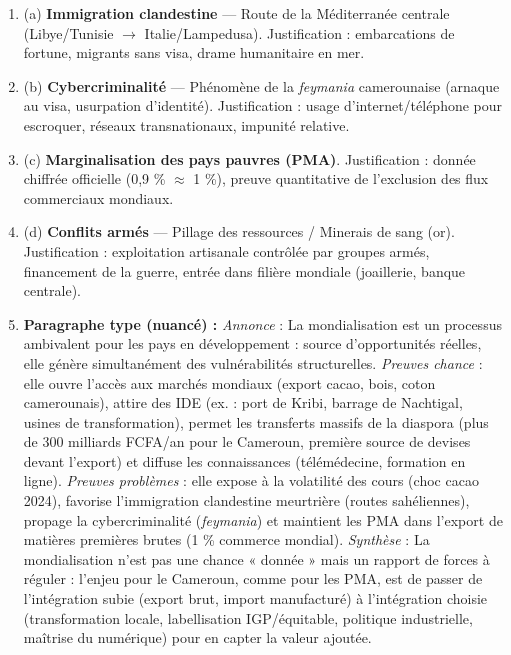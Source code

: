 \documentclass[11pt]{article}
\begin{document}
\begin{corrige}
\begin{enumerate}
\item (a) \textbf{Immigration clandestine} — Route de la Méditerranée centrale (Libye/Tunisie $\to$ Italie/Lampedusa). Justification : embarcations de fortune, migrants sans visa, drame humanitaire en mer.
\item (b) \textbf{Cybercriminalité} — Phénomène de la \emph{feymania} camerounaise (arnaque au visa, usurpation d'identité). Justification : usage d'internet/téléphone pour escroquer, réseaux transnationaux, impunité relative.
\item (c) \textbf{Marginalisation des pays pauvres (PMA)}. Justification : donnée chiffrée officielle (0,9 \% $\approx$ 1 \%), preuve quantitative de l'exclusion des flux commerciaux mondiaux.
\item (d) \textbf{Conflits armés} — Pillage des ressources / Minerais de sang (or). Justification : exploitation artisanale contrôlée par groupes armés, financement de la guerre, entrée dans filière mondiale (joaillerie, banque centrale).
\item \textbf{Paragraphe type (nuancé) :} \emph{Annonce} : La mondialisation est un processus ambivalent pour les pays en développement : source d'opportunités réelles, elle génère simultanément des vulnérabilités structurelles. \emph{Preuves chance} : elle ouvre l'accès aux marchés mondiaux (export cacao, bois, coton camerounais), attire des IDE (ex. : port de Kribi, barrage de Nachtigal, usines de transformation), permet les transferts massifs de la diaspora (plus de \num{300} milliards FCFA/an pour le Cameroun, première source de devises devant l'export) et diffuse les connaissances (télémédecine, formation en ligne). \emph{Preuves problèmes} : elle expose à la volatilité des cours (choc cacao 2024), favorise l'immigration clandestine meurtrière (routes sahéliennes), propage la cybercriminalité (\emph{feymania}) et maintient les PMA dans l'export de matières premières brutes (1 \% commerce mondial). \emph{Synthèse} : La mondialisation n'est pas une chance « donnée » mais un rapport de forces à réguler : l'enjeu pour le Cameroun, comme pour les PMA, est de passer de l'intégration subie (export brut, import manufacturé) à l'intégration choisie (transformation locale, labellisation IGP/équitable, politique industrielle, maîtrise du numérique) pour en capter la valeur ajoutée.
\end{enumerate}
\end{corrige}
\end{document}
